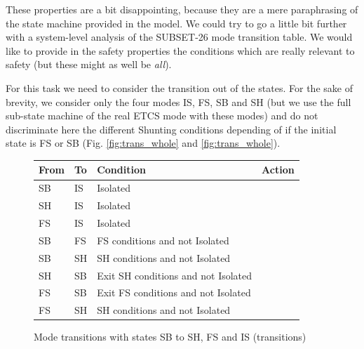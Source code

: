 \documentclass{template/openetcs_article}
\begin{document}
These properties are a bit disappointing, because they are a mere paraphrasing of the state machine
provided in the model. We could try to go a little bit further with a system-level analysis of the 
SUBSET-26 mode transition table. We would like to provide in the safety properties the conditions
which are really relevant to safety (but these might as well be \emph{all}).

For this task we need to consider the transition out of the states. 
For the sake of brevity, we consider only the four modes IS, FS, SB and SH (but we use the full sub-state
machine of the real ETCS mode with these modes) and do not discriminate here the different Shunting 
conditions depending of if the initial state is FS or SB (Fig. \ref{fig:trans_whole} and \ref{fig:trans_whole}).

\begin{figure}
 \centering
\small
\begin{tabular}{|l|l||p{3.5cm}|p{3.5cm}|}
\hline
\bf From & \bf To & \bf Condition & \bf Action \\
\hline
SB & IS & Isolated &  \\
\hline
SH & IS & Isolated &  \\
\hline
FS & IS & Isolated &  \\
\hline
SB & FS & FS conditions and not Isolated &  \\
\hline
SB & SH & SH conditions and not Isolated &  \\
\hline
SH & SB & Exit SH conditions and not Isolated &  \\
\hline
FS & SB & Exit FS conditions  and not Isolated &  \\
\hline
FS & SH & SH conditions and not Isolated &  \\
\hline
\end{tabular}
\normalsize
\caption{Mode transitions with states SB to SH, FS and IS (transitions)}
\label{fig:trans_whole_tab}
\end{figure}
\end{document}
